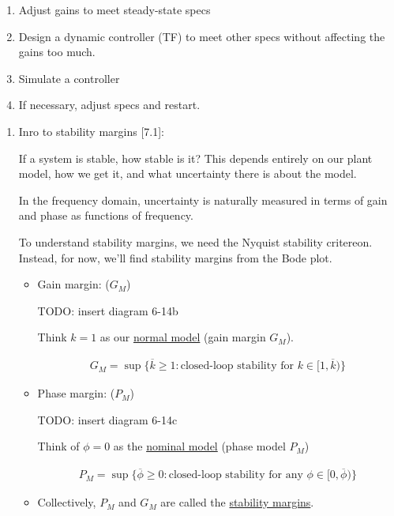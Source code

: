 \begin{enumerate}
\begin{itemize}
\begin{enumerate}
                    \item Adjust gains to meet steady-state specs
                    \item Design a dynamic controller (TF) to meet other specs without affecting the gains too much.
                    \item Simulate a controller
                    \item If necessary, adjust specs and restart.
                \end{enumerate}
        \end{itemize}
        \begin{enumerate}
            \item Inro to stability margins [7.1]:

                If a system is stable, how stable is it?
                This depends entirely on our plant model, how we get it, and what uncertainty there is about the model.

                In the frequency domain, uncertainty is naturally measured in terms of gain and phase as functions of frequency.

                To understand stability margins, we need the Nyquist stability critereon.
                Instead, for now, we'll find stability margins from the Bode plot.
                \begin{itemize}
                    \item Gain margin: ($G_M$)

                        TODO: insert diagram 6-14b

                        Think $k = 1$ as our \uline{normal model} (gain margin $G_M$).

                        \begin{align*}
                            G_M = \sup\{\overline{k} \ge 1 : \text{closed-loop stability for } k \in [1, \overline{k}) \}
                        \end{align*}
                    \item Phase margin: ($P_M$)

                        TODO: insert diagram 6-14c

                        Think of $\phi = 0$ as the \uline{nominal model} (phase model $P_M$)

                        \begin{align*}
                            P_M = \sup\{ \overline{\phi} \ge 0 : \text{closed-loop stability for any } \phi \in [0, \overline{\phi}) \}
                        \end{align*}
                    \item Collectively, $P_M$ and $G_M$ are called the \uline{stability margins}.


\end{itemize}
\end{enumerate}
\end{enumerate}
